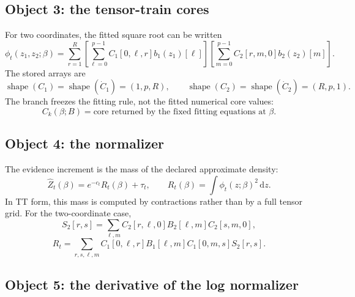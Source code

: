 \documentclass[11pt]{article}
\numberwithin{equation}{section}
\newcommand{\dd}{\,\mathrm d}
\newcommand{\shape}{\operatorname{shape}}
\begin{document}
\subsection*{Object 3: the tensor-train cores}

For two coordinates, the fitted square root can be written
\begin{equation}
    \phi_t(z_1,z_2;\beta)
    =
    \sum_{r=1}^{R}
    \left[
    \sum_{\ell=0}^{p-1}C_1[0,\ell,r]b_1(z_1)[\ell]
    \right]
    \left[
    \sum_{m=0}^{p-1}C_2[r,m,0]b_2(z_2)[m]
    \right].
    \label{eq:p24-p22-o10}
\end{equation}
The stored arrays are
\begin{equation}
    \shape(C_1)=\shape(\dot C_1)=(1,p,R),
    \qquad
    \shape(C_2)=\shape(\dot C_2)=(R,p,1).
    \label{eq:p24-p22-o11}
\end{equation}
The branch freezes the fitting rule, not the fitted numerical core values:
\begin{equation}
    C_k(\beta;B)
    =
    \text{core returned by the fixed fitting equations at }\beta.
    \label{eq:p24-p22-o12}
\end{equation}

\subsection*{Object 4: the normalizer}

The evidence increment is the mass of the declared approximate density:
\begin{equation}
    \widehat Z_t(\beta)
    =
    e^{-c_t}R_t(\beta)+\tau_t,
    \qquad
    R_t(\beta)=\int\phi_t(z;\beta)^2\dd z.
    \label{eq:p24-p22-o13}
\end{equation}
In TT form, this mass is computed by contractions rather than by a full tensor
grid.  For the two-coordinate case,
\begin{equation}
    S_2[r,s]
    =
    \sum_{\ell,m}
    C_2[r,\ell,0]B_2[\ell,m]C_2[s,m,0],
    \label{eq:p24-p22-o14}
\end{equation}
\begin{equation}
    R_t
    =
    \sum_{r,s,\ell,m}
    C_1[0,\ell,r]B_1[\ell,m]C_1[0,m,s]S_2[r,s].
    \label{eq:p24-p22-o15}
\end{equation}

\subsection*{Object 5: the derivative of the log normalizer}
\end{document}
